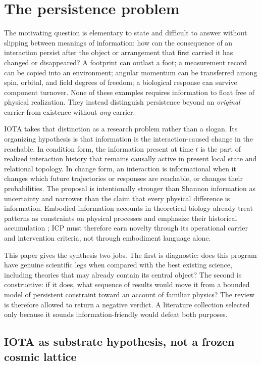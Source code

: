 \section{The persistence problem}

The motivating question is elementary to state and difficult to answer without
slipping between meanings of information: how can the consequence of an
interaction persist after the object or arrangement that first carried it has
changed or disappeared? A footprint can outlast a foot; a measurement record
can be copied into an environment; angular momentum can be transferred among
spin, orbital, and field degrees of freedom; a biological response can survive
component turnover. None of these examples requires information to float free
of physical realization. They instead distinguish persistence beyond an
\emph{original} carrier from existence without \emph{any} carrier.

IOTA takes that distinction as a research problem rather than a slogan. Its
organizing hypothesis is that information is the interaction-caused change in
the reachable. In condition form, the information present at time $t$ is the
part of realized interaction history that remains causally active in present
local state and relational topology. In change form, an interaction is
informational when it changes which future trajectories or responses are
reachable, or changes their probabilities. The proposal is intentionally
stronger than Shannon information as uncertainty and narrower than the claim
that every physical difference is information. Embodied-information accounts
in theoretical biology already treat patterns as constraints on physical
processes and emphasize their historical accumulation
\citep{Farnsworth2022Information}; ICP must therefore earn novelty through its
operational carrier and intervention criteria, not through embodiment language
alone.

This paper gives the synthesis two jobs. The first is diagnostic: does this
program have genuine scientific legs when compared with the best existing
science, including theories that may already contain its central object? The
second is constructive: if it does, what sequence of results would move it from
a bounded model of persistent constraint toward an account of familiar physics?
The review is therefore allowed to return a negative verdict. A literature
collection selected only because it sounds information-friendly would defeat
both purposes.

\subsection{IOTA as substrate hypothesis, not a frozen cosmic lattice}


